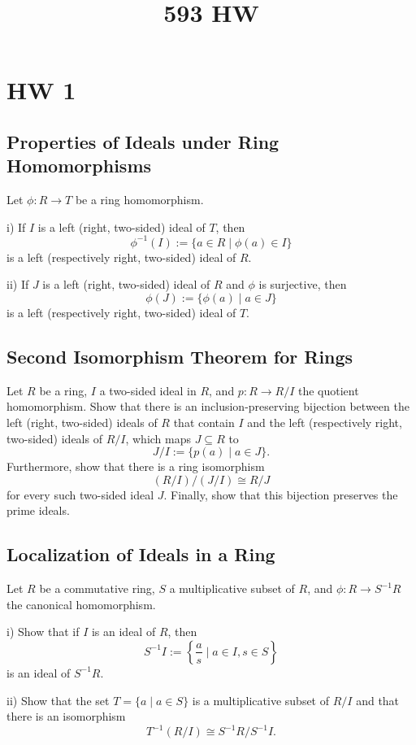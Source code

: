 \documentclass[lang=cn,11pt]{template}
\title{593 HW}
\begin{document}
\frontmatter
\tableofcontents
\mainmatter


\chapter{HW 1}

\section{Properties of Ideals under Ring Homomorphisms}
Let \( \phi : R \rightarrow T \) be a ring homomorphism.

i) If \( I \) is a left (right, two-sided) ideal of \( T \), then
\[
\phi^{-1}(I) := \{ a \in R \mid \phi(a) \in I \}
\]
is a left (respectively right, two-sided) ideal of \( R \).

ii) If \( J \) is a left (right, two-sided) ideal of \( R \) and \( \phi \) is surjective, then
\[
\phi(J) := \{ \phi(a) \mid a \in J \}
\]
is a left (respectively right, two-sided) ideal of \( T \).

\section{Second Isomorphism Theorem for Rings}
Let \( R \) be a ring, \( I \) a two-sided ideal in \( R \), and \( p : R \rightarrow R/I \) the quotient homomorphism. Show that there is an inclusion-preserving bijection between the left (right, two-sided) ideals of \( R \) that contain \( I \) and the left (respectively right, two-sided) ideals of \( R/I \), which maps \( J \subseteq R \) to
\[
J/I := \{ p(a) \mid a \in J \}.
\]
Furthermore, show that there is a ring isomorphism
\[
(R/I)/(J/I) \cong R/J
\]
for every such two-sided ideal \( J \). Finally, show that this bijection preserves the prime ideals.

\section{Localization of Ideals in a Ring}
Let \( R \) be a commutative ring, \( S \) a multiplicative subset of \( R \), and \( \phi : R \rightarrow S^{-1}R \) the canonical homomorphism.

i) Show that if \( I \) is an ideal of \( R \), then
\[
S^{-1}I := \left\{ \frac{a}{s} \mid a \in I, s \in S \right\}
\]
is an ideal of \( S^{-1}R \).

ii) Show that the set \( T = \{ a \mid a \in S \} \) is a multiplicative subset of \( R/I \) and that there is an isomorphism
\[
T^{-1}(R/I) \cong S^{-1}R / S^{-1}I.
\]
\end{document}
